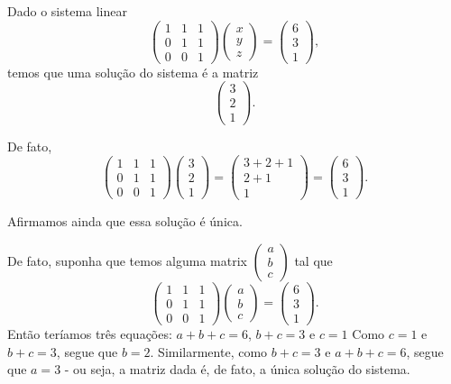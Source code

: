 \begin{ex}
	Dado o sistema linear
	\[\begin{pmatrix}
	1 & 1 & 1\\
	0 & 1 & 1\\
	0 & 0 & 1
	\end{pmatrix}\begin{pmatrix}
	x\\
	y\\
	z
	\end{pmatrix}=\begin{pmatrix}
	6\\
	3\\
	1
	\end{pmatrix},\] temos que uma solução do sistema é a matriz
	\[\begin{pmatrix}
	3\\
	2\\
	1
	\end{pmatrix}.\]
	
	De fato,
	\[\begin{pmatrix}
	1 & 1 & 1\\
	0 & 1 & 1\\
	0 & 0 & 1
	\end{pmatrix}\begin{pmatrix}
	3\\
	2\\
	1
	\end{pmatrix}=\begin{pmatrix}
	3+2+1\\
	2+1\\
	1
	\end{pmatrix}=\begin{pmatrix}
	6\\
	3\\
	1
	\end{pmatrix}.\]
	
	Afirmamos ainda que essa solução é única.
	
	De fato, suponha que temos alguma matrix $\begin{pmatrix}
	a\\b\\c
	\end{pmatrix}$ tal que 
	\[\begin{pmatrix}
	1 & 1 & 1\\
	0 & 1 & 1\\
	0 & 0 & 1
	\end{pmatrix}\begin{pmatrix}
	a\\b\\c
	\end{pmatrix}=\begin{pmatrix}
	6\\
	3\\
	1
	\end{pmatrix}.\] Então teríamos três equações: $a+b+c=6$, $b+c=3$ e $c=1$ Como $c=1$ e $b+c=3$, segue que $b=2$. Similarmente, como $b+c=3$ e $a+b+c=6$, segue que $a=3$ -  ou seja, a matriz dada é, de fato, a única solução do sistema.
\end{ex}

